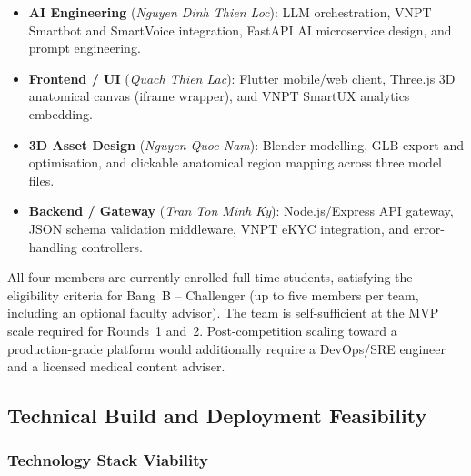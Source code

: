\begin{itemize}[leftmargin=2em, itemsep=2pt, topsep=4pt]
  \item \textbf{AI Engineering} (\textit{Nguyen Dinh Thien Loc}):
        LLM orchestration, VNPT Smartbot and SmartVoice integration,
        FastAPI AI microservice design, and prompt engineering.
  \item \textbf{Frontend / UI} (\textit{Quach Thien Lac}):
        Flutter mobile/web client, Three.js 3D anatomical canvas
        (iframe wrapper), and VNPT SmartUX analytics embedding.
  \item \textbf{3D Asset Design} (\textit{Nguyen Quoc Nam}):
        Blender modelling, GLB export and optimisation, and clickable
        anatomical region mapping across three model files.
  \item \textbf{Backend / Gateway} (\textit{Tran Ton Minh Ky}):
        Node.js/Express API gateway, JSON schema validation middleware,
        VNPT eKYC integration, and error-handling controllers.
\end{itemize}

All four members are currently enrolled full-time students, satisfying the
eligibility criteria for Bang~B -- Challenger (up to five members per team,
including an optional faculty advisor). The team is self-sufficient at the
MVP scale required for Rounds~1 and~2. Post-competition scaling toward a
production-grade platform would additionally require a DevOps/SRE engineer
and a licensed medical content adviser.


\subsection{Technical Build and Deployment Feasibility}
\label{sec:feasibility-tech}

\subsubsection*{Technology Stack Viability}


